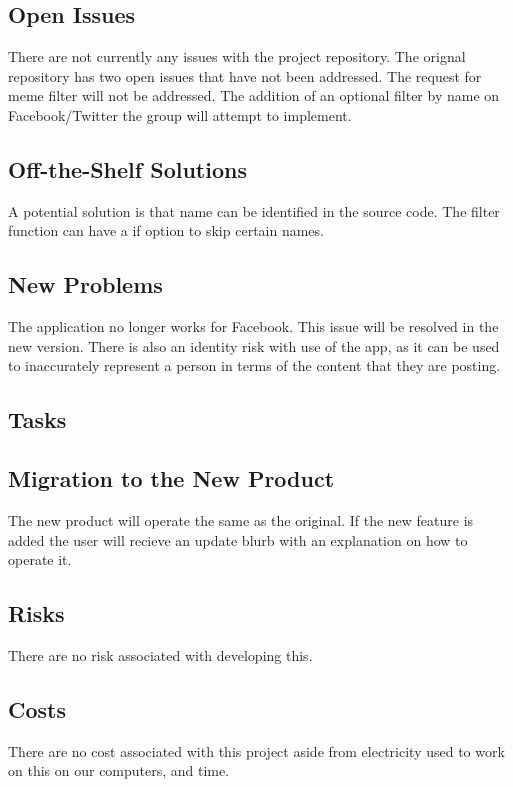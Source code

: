 \documentclass[12pt, titlepage]{article}
\begin{document}
\subsection{Open Issues}
There are not currently any issues with the project repository. The orignal repository has two open issues that have not been addressed. The request for meme filter will not be addressed. The addition of an optional filter by name on Facebook/Twitter the group will attempt to implement. 

\subsection{Off-the-Shelf Solutions}
A potential solution is that name can be identified in the source code. The filter function can have a if option to skip certain names.

\subsection{New Problems}
The application no longer works for Facebook. This issue will be resolved in the new version. There is also an identity risk with use of the app, as it can be used to inaccurately represent a person in terms of the content that they are posting.

\subsection{Tasks}

\subsection{Migration to the New Product}
The new product will operate the same as the original. If the new feature is added the user will recieve an update blurb with an explanation on how to operate it. 

\subsection{Risks}
There are no risk associated with developing this.

\subsection{Costs}
There are no cost associated with this project aside from electricity used to work on this on our computers, and time. 
\end{document}
